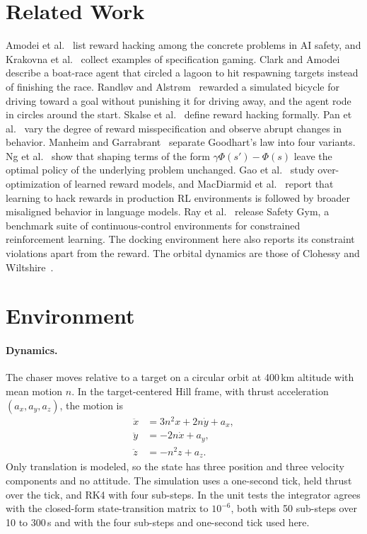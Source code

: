 \documentclass[11pt]{article}
\begin{document}
\section{Related Work}

Amodei et al.~\cite{amodei2016} list reward hacking among the concrete problems
in AI safety, and Krakovna et al.~\cite{krakovna2020} collect examples of
specification gaming. Clark and Amodei~\cite{clark2016} describe a boat-race
agent that circled a lagoon to hit respawning targets instead of finishing the
race. Randl{\o}v and Alstr{\o}m~\cite{randlov1998} rewarded a simulated bicycle
for driving toward a goal without punishing it for driving away, and the agent
rode in circles around the start. Skalse et al.~\cite{skalse2022} define reward
hacking formally. Pan et al.~\cite{pan2022} vary the degree of reward
misspecification and observe abrupt changes in behavior. Manheim and
Garrabrant~\cite{manheim2018} separate Goodhart's law into four variants. Ng et
al.~\cite{ng1999} show that shaping terms of the form
$\gamma\Phi(s')-\Phi(s)$ leave the optimal policy of the underlying problem
unchanged. Gao et al.~\cite{gao2023} study over-optimization of learned reward
models, and MacDiarmid et al.~\cite{macdiarmid2025} report that learning to hack
rewards in production RL environments is followed by broader misaligned
behavior in language models. Ray et al.~\cite{ray2019} release Safety Gym, a
benchmark suite of continuous-control environments for constrained
reinforcement learning. The docking environment here also reports its
constraint violations apart from the reward. The orbital dynamics are those of
Clohessy and Wiltshire~\cite{cw1960}.

\section{Environment}
\label{sec:env}

\paragraph{Dynamics.} The chaser moves relative to a target on a circular orbit
at 400\,km altitude with mean motion $n$. In the target-centered Hill frame,
with thrust acceleration $(a_x,a_y,a_z)$, the motion is
\begin{align}
\ddot{x} &= 3n^2 x + 2n\dot{y} + a_x, \\
\ddot{y} &= -2n\dot{x} + a_y, \\
\ddot{z} &= -n^2 z + a_z .
\end{align}
Only translation is modeled, so the state has three position and three velocity
components and no attitude. The simulation uses a one-second tick, held thrust
over the tick, and RK4 with four sub-steps. In the unit tests the integrator
agrees with the closed-form state-transition matrix to $10^{-6}$, both with 50
sub-steps over 10 to 300\,s and with the four sub-steps and one-second tick
used here.
\end{document}
